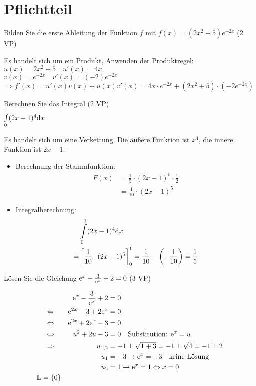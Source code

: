 

\newcommand{\pts}[1]{\hfill (#1 VP)}


\section{Pflichtteil}
 Bilden Sie die erste Ableitung der Funktion $f$ mit $f(x) = (2x^2+5)e^{-2x}$ \pts{2}
\begin{lsg}{}
Es handelt sich um ein Produkt, Anwenden der Produktregel:\\
$u(x) = 2x^2+5 \quad u'(x)=4x$\\
$v(x) = e^{-2x} \quad v'(x)=(-2)e^{-2x}$\\
$\Rightarrow f'(x)=u'(x)v(x)+u(x)v'(x) = 4x\cdot e^{-2x}+(2x^2+5)\cdot(-2e^{-2x})$
\end{lsg}

 Berechnen Sie das Integral \pts{2}\\
$\int\limits_0^1(2x-1)^4 \mathrm{d} x$
\begin{lsg}{}
Es handelt sich um eine Verkettung.
Die äußere Funktion ist $x^4$, die innere Funktion ist $2x-1$.\\
\begin{itemize}
  \item  Berechnung der Stammfunktion:
  \begin{align*}
    F(x) &= \frac 1 5 \cdot(2x-1)^5\cdot\frac 1 2\\
    &=\frac{1}{10}\cdot(2x-1)^5
  \end{align*}
  \item Integralberechnung:
  \begin{align*}
    &\int\limits_0^1(2x-1)^4 \mathrm{d} x\\
    =&\left[\frac{1}{10}\cdot(2x-1)^5\right]^1_0 = \frac{1}{10}-\left(-\frac{1}{10}\right) = \frac 1 5
  \end{align*}
\end{itemize}
\end{lsg}

Lösen Sie die Gleichung $\mathrm{e}^x-\frac{3}{\mathrm{e}^x}+2=0$ \pts{3}\\
\begin{lsg}{}
\begin{alignat*}{2}
    &&\mathrm{e}^x-\frac{3}{\mathrm{e}^x}+2 &= 0\\
    \Leftrightarrow\quad && \mathrm{e}^{2x}-3+2\mathrm{e}^x &= 0\\
    \Leftrightarrow\quad && \mathrm{e}^{2x}+2\mathrm{e}^x-3 &= 0\\
    \Leftrightarrow\quad && u^2+2u-3 &= 0 \quad\text{Substitution: }\mathrm{e}^x=u\\
    \Rightarrow\quad && u_{1,2} &= -1\pm\sqrt{1+3}=-1\pm\sqrt{4}=-1\pm2\\
    && u_1 &= -3 \rightarrow \mathrm{e}^x = -3 \quad\text{keine Lösung}\\
    && u_2 &= 1 \rightarrow \mathrm{e}^x = 1 \Leftrightarrow x=0\\
    \mathbb{L} = \{0\}
\end{alignat*}
\end{lsg}

